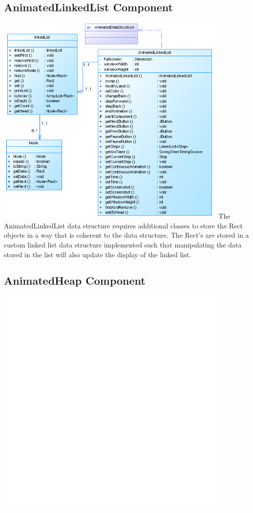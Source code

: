 \documentclass{l3proj}
\begin{document}
\subsection{AnimatedLinkedList Component}

\includegraphics[width=115mm]{images/linkedListDiagram.png}
The AnimatedLinkedList data structure requires additional classes to store the Rect objects in a way that is coherent to the data structure.
The Rect's are stored in a custom linked list data structure implemented such that manipulating the data stored in the list will also update the display of
the linked list.
\subsection{AnimatedHeap Component}
\includegraphics[width=115mm]{images/heapDiagram.png}
\end{document}
